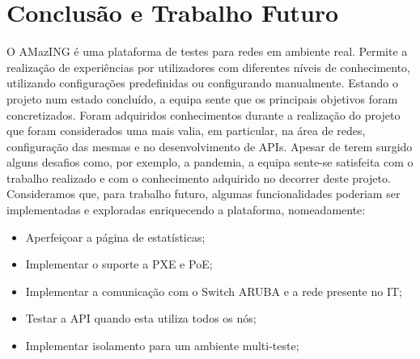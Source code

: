 \chapter{Conclusão e Trabalho Futuro}
O AMazING é uma plataforma de testes para redes em ambiente real. Permite a realização de experiências por utilizadores com diferentes níveis de conhecimento, utilizando configurações predefinidas ou configurando manualmente.\newline
Estando o projeto num estado concluído, a equipa sente que os principais objetivos foram concretizados. Foram adquiridos conhecimentos durante a realização do projeto que foram considerados uma mais valia, em particular, na área de redes, configuração das mesmas e no desenvolvimento de APIs.\newline
Apesar de terem surgido alguns desafios como, por exemplo, a pandemia, a equipa sente-se satisfeita com o trabalho realizado e com o conhecimento adquirido no decorrer deste projeto. Consideramos que, para trabalho futuro, algumas funcionalidades poderiam ser implementadas e exploradas enriquecendo a plataforma, nomeadamente:
\begin{itemize}
    \item Aperfeiçoar a página de estatísticas;
    \item Implementar o suporte a PXE e PoE;
    \item Implementar a comunicação com o Switch ARUBA e a rede presente no IT;
    \item Testar a API quando esta utiliza todos os nós;
    \item Implementar isolamento para um ambiente multi-teste;
\end{itemize}
\newpage
\hfill\break